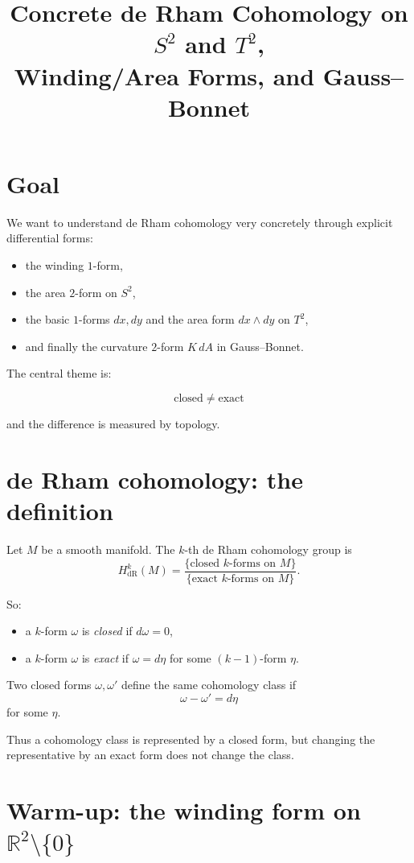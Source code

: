 \documentclass[11pt]{article}
\title{Concrete de Rham Cohomology on \(S^2\) and \(T^2\),\\
	Winding/Area Forms, and Gauss--Bonnet}
\author{}
\date{}
\begin{document}
	\maketitle
	
	\section{Goal}
	
	We want to understand de Rham cohomology very concretely through explicit differential forms:
	\begin{itemize}[leftmargin=2em]
		\item the winding \(1\)-form,
		\item the area \(2\)-form on \(S^2\),
		\item the basic \(1\)-forms \(dx,dy\) and the area form \(dx\wedge dy\) on \(T^2\),
		\item and finally the curvature \(2\)-form \(K\,dA\) in Gauss--Bonnet.
	\end{itemize}
	
	The central theme is:
	
	\[
	\boxed{\text{closed} \;\neq\; \text{exact}}
	\]
	
	and the difference is measured by topology.
	
	\section{de Rham cohomology: the definition}
	
	Let \(M\) be a smooth manifold. The \(k\)-th de Rham cohomology group is
	\[
	H^k_{\mathrm{dR}}(M)
	=
	\frac{\{\text{closed }k\text{-forms on }M\}}
	{\{\text{exact }k\text{-forms on }M\}}.
	\]
	
	So:
	\begin{itemize}[leftmargin=2em]
		\item a \(k\)-form \(\omega\) is \emph{closed} if \(d\omega=0\),
		\item a \(k\)-form \(\omega\) is \emph{exact} if \(\omega=d\eta\) for some \((k-1)\)-form \(\eta\).
	\end{itemize}
	
	Two closed forms \(\omega,\omega'\) define the same cohomology class if
	\[
	\omega-\omega' = d\eta
	\]
	for some \(\eta\).
	
	Thus a cohomology class is represented by a closed form, but changing the representative by an exact form does not change the class.
	
	\section{Warm-up: the winding form on \(\mathbb{R}^2\setminus\{0\}\)}
	
\end{document}
